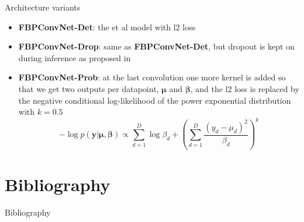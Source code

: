 \documentclass{beamer}
\begin{document}
	\begin{frame}{Architecture variants}
		\begin{itemize}
			\item \textbf{FBPConvNet-Det}: the \cite{jin_deep_2017} et al model with l2 loss
			\item \textbf{FBPConvNet-Drop}: same as \textbf{FBPConvNet-Det}, but dropout is kept on during inference as proposed in \cite{gal_dropout_2015}
			\item \textbf{FBPConvNet-Prob}: at the last convolution one more kernel is added so that we get two outputs per datapoint, $\boldsymbol{\mu}$ and $\boldsymbol{\beta}$, and the l2 loss is replaced by the negative conditional log-likelihood of the power exponential distribution with $k=0.5$ $$-\log p(\mathbf{y}|\boldsymbol{\mu}, \boldsymbol{\beta}) \propto\sum_{d=1}^D \log \beta_d + (\sum_{d=1}^D \frac{(y_d - \mu_d)^2}{\beta_d})^k$$
			
		\end{itemize}
	\end{frame}
	
	
	
	\section{Bibliography}
	\begin{frame}[allowframebreaks]{Bibliography}
		
		
	\end{frame}
\end{document}
